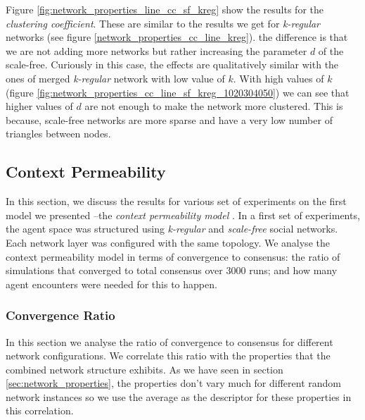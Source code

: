 \documentclass[preprint,number]{elsarticle}
\begin{document}
\noindent Figure \ref{fig:network_properties_line_cc_sf_kreg} show the results for the \textit{clustering coefficient}. These are similar to the results we get for \textit{k-regular} networks (see figure \ref{network_properties_cc_line_kreg}). the difference is that we are not adding more networks but rather increasing the parameter $d$ of the scale-free. Curiously in this case, the effects are qualitatively similar with the ones of merged \textit{k-regular} network with low value of $k$. With high values of $k$ (figure \ref{fig:network_properties_cc_line_sf_kreg_1020304050}) we can see that higher values of $d$ are not enough to make the network more clustered. This is because, scale-free networks are more sparse and have a very low number of triangles between nodes.

\subsection{Context Permeability}
\label{sec:results:context_permeability}

In this section, we discuss the results for various set of experiments on the first model we presented --the \textit{context permeability model} \cite{Antunes2007,Antunes2010}. In a first set of experiments, the agent space was structured using \textit{k-regular} and \textit{scale-free }social networks. Each network layer was configured with the same topology. We analyse the context permeability model in terms of convergence to consensus: the ratio of simulations that converged to total consensus over 3000 runs; and how many agent encounters were needed for this to happen. 

\subsubsection{Convergence Ratio}
\label{sec:ctx_perm_convergence}
In this section we analyse the ratio of convergence to consensus for different network configurations. We correlate this ratio with the properties that the combined network structure exhibits. As we have seen in section \ref{sec:network_properties}, the properties don't vary much for different random network instances so we use the average as the descriptor for these properties in this correlation.
\end{document}
